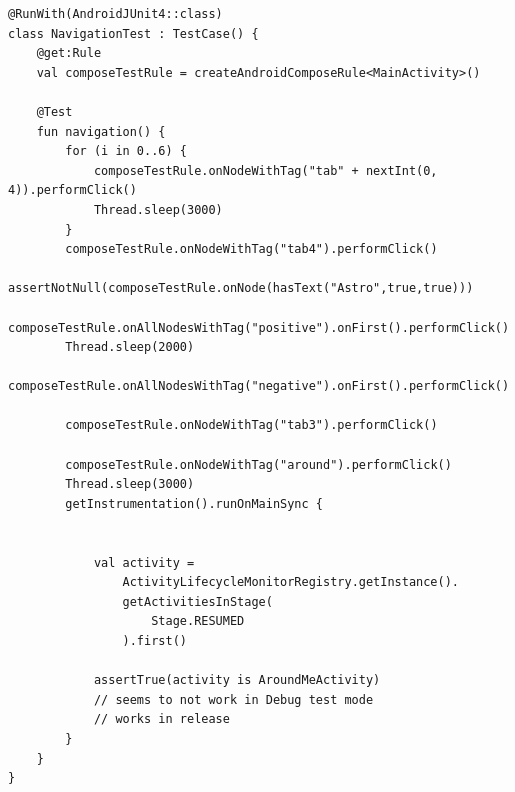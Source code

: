 \begin{verbatim}
@RunWith(AndroidJUnit4::class)
class NavigationTest : TestCase() {
    @get:Rule
    val composeTestRule = createAndroidComposeRule<MainActivity>()

    @Test
    fun navigation() {
        for (i in 0..6) {
            composeTestRule.onNodeWithTag("tab" + nextInt(0, 4)).performClick()
            Thread.sleep(3000)
        }
        composeTestRule.onNodeWithTag("tab4").performClick()
        assertNotNull(composeTestRule.onNode(hasText("Astro",true,true)))
        composeTestRule.onAllNodesWithTag("positive").onFirst().performClick()
        Thread.sleep(2000)
        composeTestRule.onAllNodesWithTag("negative").onFirst().performClick()

        composeTestRule.onNodeWithTag("tab3").performClick()

        composeTestRule.onNodeWithTag("around").performClick()
        Thread.sleep(3000)
        getInstrumentation().runOnMainSync {


            val activity =
                ActivityLifecycleMonitorRegistry.getInstance().
                getActivitiesInStage(
                    Stage.RESUMED
                ).first()

            assertTrue(activity is AroundMeActivity) 
            // seems to not work in Debug test mode
            // works in release
        }
    }
}

\end{verbatim}
